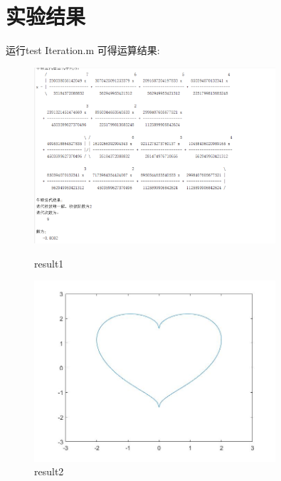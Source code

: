 \documentclass[12pt]{article} %
\begin{document}
	\section{实验结果}
	运行test Iteration.m
	\indent 可得运算结果:
	\begin{figure}[ht]
		\centering
		\includegraphics[width=0.8\textwidth]{Iteration.png}
		\caption{result1}
		\label{fig:fig1}
		\centering
	\includegraphics[width=0.8\textwidth]{figure.jpg}
	\caption{result2}
	\label{fig:fig1}		
	\end{figure}
	
	
	
	
\end{document}
